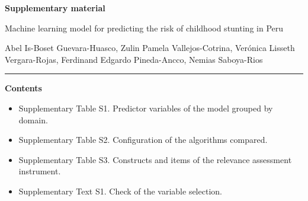 \documentclass[11pt]{article}
\begin{document}
{\Large\bfseries Supplementary material\par}
\vspace{4pt}
{\large Machine learning model for predicting the risk of childhood stunting in Peru\par}
\vspace{4pt}
{\small Abel Is-Boset Guevara-Huasco, Zulin Pamela Vallejos-Cotrina, Ver\'onica Lisseth Vergara-Rojas,
Ferdinand Edgardo Pineda-Ancco, Nemias Saboya-Rios\par}
\vspace{2pt}
\hrule
\vspace{6pt}

\textbf{Contents}
\begin{itemize}[nosep,leftmargin=1.2em]
  \item Supplementary Table S1. Predictor variables of the model grouped by domain.
  \item Supplementary Table S2. Configuration of the algorithms compared.
  \item Supplementary Table S3. Constructs and items of the relevance assessment instrument.
  \item Supplementary Text S1. Check of the variable selection.
\end{itemize}
\end{document}
